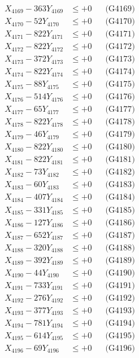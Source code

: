 \documentclass[a4paper,10pt]{article}
\begin{document}
{\begin{align}
X_{4169} - 363Y_{4169} &\leq +0 && \text{(G4169)} \\
X_{4170} - 52Y_{4170} &\leq +0 && \text{(G4170)} \\
\allowbreak
X_{4171} - 822Y_{4171} &\leq +0 && \text{(G4171)} \\
X_{4172} - 822Y_{4172} &\leq +0 && \text{(G4172)} \\
X_{4173} - 372Y_{4173} &\leq +0 && \text{(G4173)} \\
X_{4174} - 822Y_{4174} &\leq +0 && \text{(G4174)} \\
X_{4175} - 88Y_{4175} &\leq +0 && \text{(G4175)} \\
X_{4176} - 514Y_{4176} &\leq +0 && \text{(G4176)} \\
X_{4177} - 65Y_{4177} &\leq +0 && \text{(G4177)} \\
X_{4178} - 822Y_{4178} &\leq +0 && \text{(G4178)} \\
X_{4179} - 46Y_{4179} &\leq +0 && \text{(G4179)} \\
X_{4180} - 822Y_{4180} &\leq +0 && \text{(G4180)} \\
\allowbreak
X_{4181} - 822Y_{4181} &\leq +0 && \text{(G4181)} \\
X_{4182} - 73Y_{4182} &\leq +0 && \text{(G4182)} \\
X_{4183} - 60Y_{4183} &\leq +0 && \text{(G4183)} \\
X_{4184} - 407Y_{4184} &\leq +0 && \text{(G4184)} \\
X_{4185} - 331Y_{4185} &\leq +0 && \text{(G4185)} \\
X_{4186} - 127Y_{4186} &\leq +0 && \text{(G4186)} \\
X_{4187} - 652Y_{4187} &\leq +0 && \text{(G4187)} \\
X_{4188} - 320Y_{4188} &\leq +0 && \text{(G4188)} \\
X_{4189} - 392Y_{4189} &\leq +0 && \text{(G4189)} \\
X_{4190} - 44Y_{4190} &\leq +0 && \text{(G4190)} \\
\allowbreak
X_{4191} - 733Y_{4191} &\leq +0 && \text{(G4191)} \\
X_{4192} - 276Y_{4192} &\leq +0 && \text{(G4192)} \\
X_{4193} - 377Y_{4193} &\leq +0 && \text{(G4193)} \\
X_{4194} - 781Y_{4194} &\leq +0 && \text{(G4194)} \\
X_{4195} - 614Y_{4195} &\leq +0 && \text{(G4195)} \\
X_{4196} - 69Y_{4196} &\leq +0 && \text{(G4196)} \\

\end{align}}
\end{document}
